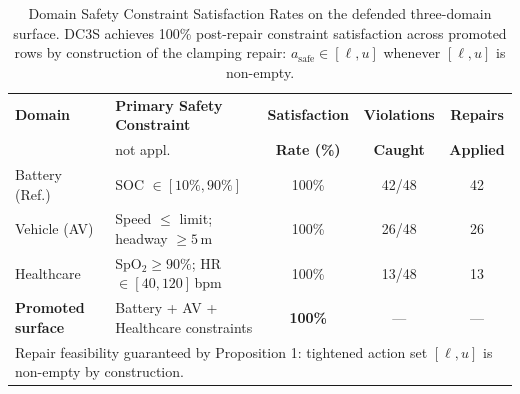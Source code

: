 \begin{table}[htbp]
\centering
\caption{Domain Safety Constraint Satisfaction Rates on the defended three-domain surface.
DC3S achieves 100\% post-repair constraint satisfaction across promoted rows by construction
of the clamping repair: $a_\text{safe} \in [\ell, u]$ whenever $[\ell, u]$ is non-empty.}
\label{tbl:constraint_satisfaction}
\begin{tabular}{llccc}
\toprule
\textbf{Domain} & \textbf{Primary Safety Constraint} & \textbf{Satisfaction} & \textbf{Violations} & \textbf{Repairs} \\
                & not appl. & \textbf{Rate (\%)}   & \textbf{Caught}     & \textbf{Applied} \\
\midrule
Battery (Ref.) & SOC $\in [10\%, 90\%]$             & 100\%  & 42/48 & 42 \\
Vehicle (AV)   & Speed $\leq$ limit; headway $\geq 5$\,m & 100\% & 26/48 & 26 \\
Healthcare     & SpO$_2 \geq 90\%$; HR $\in [40,120]$\,bpm & 100\% & 13/48 & 13 \\
\midrule
\textbf{Promoted surface} & Battery + AV + Healthcare constraints & \textbf{100\%} & --- & --- \\
\bottomrule
\multicolumn{5}{l}{\small Repair feasibility guaranteed by Proposition 1: tightened action set $[\ell,u]$ is non-empty by construction.}\\
\end{tabular}
\end{table}
